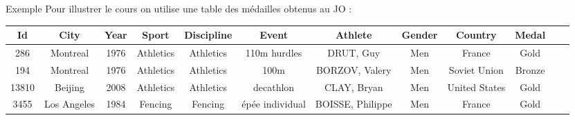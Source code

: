 \documentclass[10pt]{beamer}
\begin{document}
\begin{frame}{\Ctitle}{\stitle}
	\begin{exampleblock}{Exemple}
		Pour illustrer le cours on utilise une table des médailles obtenus au JO :\\
		\begin{tabular}{|>{\tiny}c|>{\tiny}c|>{\tiny}c|>{\tiny}c|>{\tiny}c|>{\tiny}c|>{\tiny}c|>{\tiny}c|>{\tiny}c|>{\tiny}c|>{\tiny}c|>{\tiny}c|}
			\hline
			Id    & City        & Year & Sport     & Discipline & Event           & Athlete          & Gender & Country       & Medal  \\
			\hline
			286   & Montreal    & 1976 & Athletics & Athletics  & 110m hurdles    & DRUT, Guy        & Men    & France        & Gold   \\
			\hline
			194   & Montreal    & 1976 & Athletics & Athletics  & 100m            & BORZOV, Valery   & Men    & Soviet Union  & Bronze \\
			\hline
			13810 & Beijing     & 2008 & Athletics & Athletics  & decathlon       & CLAY, Bryan      & Men    & United States & Gold   \\
			\hline
			3455  & Los Angeles & 1984 & Fencing   & Fencing    & épée individual & BOISSE, Philippe & Men    & France        & Gold   \\
			\hline
		\end{tabular}
	\end{exampleblock}
\end{frame}
\end{document}
